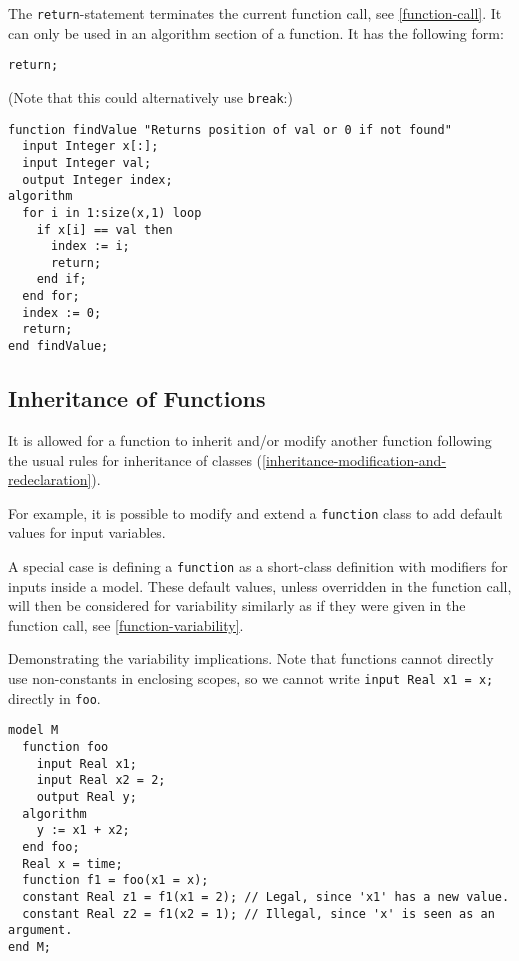 The \lstinline!return!-statement terminates the current function call, see \cref{function-call}.
It can only be used in an algorithm section of a function.
It has the following form:
\begin{lstlisting}[language=modelica]
return;
\end{lstlisting}

\begin{example}
(Note that this could alternatively use \lstinline!break!:)
\begin{lstlisting}[language=modelica]
function findValue "Returns position of val or 0 if not found"
  input Integer x[:];
  input Integer val;
  output Integer index;
algorithm
  for i in 1:size(x,1) loop
    if x[i] == val then
      index := i;
      return;
    end if;
  end for;
  index := 0;
  return;
end findValue;
\end{lstlisting}
\end{example}

\subsection{Inheritance of Functions}\label{inheritance-of-functions}

It is allowed for a function to inherit and/or modify another function following the usual rules for inheritance of classes (\cref{inheritance-modification-and-redeclaration}).

\begin{nonnormative}
For example, it is possible to modify and extend a \lstinline!function! class to add default values for input variables.
\end{nonnormative}

A special case is defining a \lstinline!function! as a short-class definition with modifiers for inputs inside a model.
These default values, unless overridden in the function call, will then be considered for variability similarly as if they were given in the function call, see \cref{function-variability}.

\begin{example}
Demonstrating the variability implications.
Note that functions cannot directly use non-constants in enclosing scopes, so we cannot write \lstinline!input Real x1 = x;! directly in \lstinline!foo!.
\begin{lstlisting}[language=modelica]
model M
  function foo
    input Real x1;
    input Real x2 = 2;
    output Real y;
  algorithm
    y := x1 + x2;
  end foo;
  Real x = time;
  function f1 = foo(x1 = x);
  constant Real z1 = f1(x1 = 2); // Legal, since 'x1' has a new value.
  constant Real z2 = f1(x2 = 1); // Illegal, since 'x' is seen as an argument.
end M;
\end{lstlisting}
\end{example}

